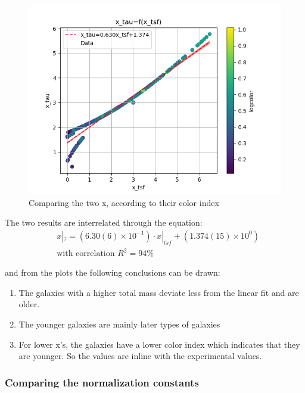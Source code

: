 \documentclass[a4paper,twocolumn]{article}
\begin{document}
\begin{figure}[htbp]
\centering
\includegraphics[width=.9\linewidth]{./figs/x_tsf-x_tau-color_logcolor.png}
\caption{\label{fig:Comparing the two x, according to their color index}Comparing the two x, according to their color index}
\end{figure}

The two results are interrelated through the equation:
\begin{equation}\label{eq:x_tsf-x_tau}
\begin{align}
& x|_\tau = (6.30(6) \times 10^{-1})\cdot x|_{tsf} + (1.374(15) \times 10^{0}) \\ 
& \textrm{with correlation } R^2=94\%
\end{align}
\end{equation}

and from the plots the following conclusions can be drawn:

\begin{enumerate}
\item The galaxies with a higher total mass deviate less from the linear fit and are older.
\item The younger galaxies are mainly later types of galaxies
\item For lower x's, the galaxies have a lower color index which indicates that they are younger. So the values are inline with the experimental values.
\end{enumerate}

\subsubsection{Comparing the normalization constants}
\label{sec:orgcf339e2}
\end{document}
